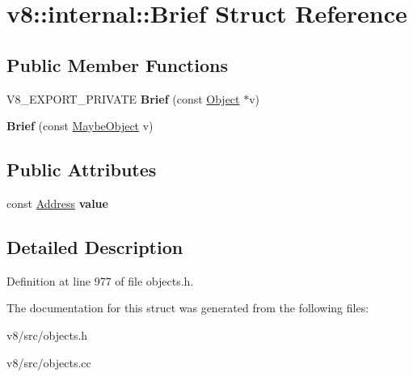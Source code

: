\hypertarget{structv8_1_1internal_1_1Brief}{}\section{v8\+:\+:internal\+:\+:Brief Struct Reference}
\label{structv8_1_1internal_1_1Brief}
\subsection*{Public Member Functions}
\begin{DoxyCompactItemize}
\item 
\mbox{\label{structv8_1_1internal_1_1Brief_a902d8af19d27160cfbfda36101185fbf}} 
V8\+\_\+\+E\+X\+P\+O\+R\+T\+\_\+\+P\+R\+I\+V\+A\+TE {\bfseries Brief} (const \mbox{\hyperlink{classv8_1_1internal_1_1Object}{Object}} $\ast$v)
\item 
\mbox{\label{structv8_1_1internal_1_1Brief_afb1d6d742aec907a46504462ddf64a08}} 
{\bfseries Brief} (const \mbox{\hyperlink{classv8_1_1internal_1_1MaybeObject}{Maybe\+Object}} v)
\end{DoxyCompactItemize}
\subsection*{Public Attributes}
\begin{DoxyCompactItemize}
\item 
\mbox{\label{structv8_1_1internal_1_1Brief_af305f8f11c21c8ea2ffee71a0e56aff6}} 
const \mbox{\hyperlink{classuintptr__t}{Address}} {\bfseries value}
\end{DoxyCompactItemize}


\subsection{Detailed Description}


Definition at line 977 of file objects.\+h.



The documentation for this struct was generated from the following files\+:\begin{DoxyCompactItemize}
\item 
v8/src/objects.\+h\item 
v8/src/objects.\+cc\end{DoxyCompactItemize}
